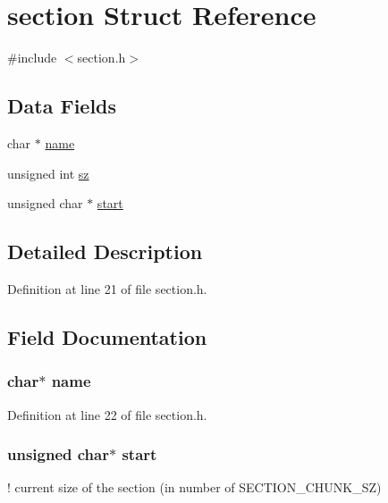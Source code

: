 \hypertarget{structsection}{\section{section Struct Reference}
\label{structsection}
}


{\ttfamily \#include $<$section.\-h$>$}

\subsection*{Data Fields}
\begin{DoxyCompactItemize}
\item 
char $\ast$ \hyperlink{structsection_a5ac083a645d964373f022d03df4849c8}{name}
\item 
unsigned int \hyperlink{structsection_a2c1bd10d4bbc82d2d6c052c5842c0c8c}{sz}
\item 
unsigned char $\ast$ \hyperlink{structsection_a9bd18c71f4707f6f2406b1d1ac806587}{start}
\end{DoxyCompactItemize}


\subsection{Detailed Description}


Definition at line 21 of file section.\-h.



\subsection{Field Documentation}
\hypertarget{structsection_a5ac083a645d964373f022d03df4849c8}{
\subsubsection[{name}]{\setlength{\rightskip}{0pt plus 5cm}char$\ast$ name}}\label{structsection_a5ac083a645d964373f022d03df4849c8}


Definition at line 22 of file section.\-h.

\hypertarget{structsection_a9bd18c71f4707f6f2406b1d1ac806587}{
\subsubsection[{start}]{\setlength{\rightskip}{0pt plus 5cm}unsigned char$\ast$ start}}\label{structsection_a9bd18c71f4707f6f2406b1d1ac806587}
! current size of the section (in number of S\-E\-C\-T\-I\-O\-N\-\_\-\-C\-H\-U\-N\-K\-\_\-\-S\-Z) 

